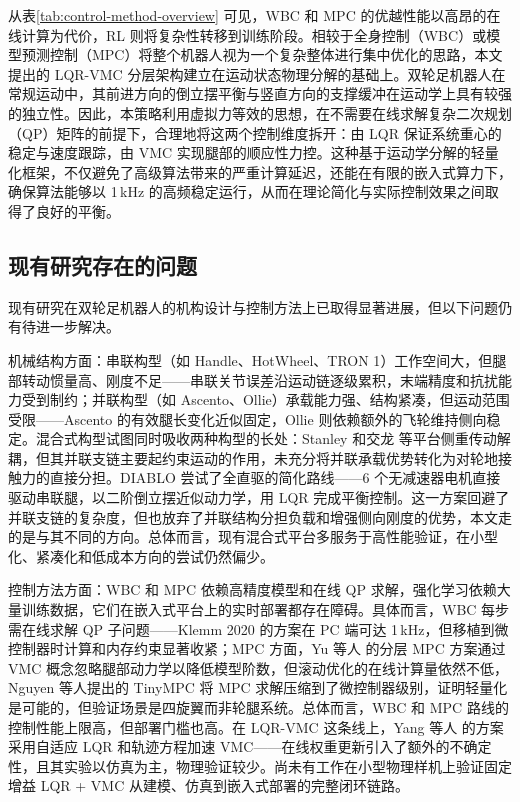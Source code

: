 从表\ref{tab:control-method-overview} 可见，WBC 和 MPC 的优越性能以高昂的在线计算为代价，RL 则将复杂性转移到训练阶段。相较于全身控制（WBC）或模型预测控制（MPC）将整个机器人视为一个复杂整体进行集中优化的思路，本文提出的 LQR-VMC 分层架构建立在运动状态物理分解的基础上。双轮足机器人在常规运动中，其前进方向的倒立摆平衡与竖直方向的支撑缓冲在运动学上具有较强的独立性。因此，本策略利用虚拟力等效的思想，在不需要在线求解复杂二次规划（QP）矩阵的前提下，合理地将这两个控制维度拆开：由 LQR 保证系统重心的稳定与速度跟踪，由 VMC 实现腿部的顺应性力控。这种基于运动学分解的轻量化框架，不仅避免了高级算法带来的严重计算延迟，还能在有限的嵌入式算力下，确保算法能够以 1\,kHz 的高频稳定运行，从而在理论简化与实际控制效果之间取得了良好的平衡。

\subsection{现有研究存在的问题}

现有研究在双轮足机器人的机构设计与控制方法上已取得显著进展，但以下问题仍有待进一步解决。

机械结构方面：串联构型（如 Handle\cite{boston2023handle}、HotWheel\cite{yu2023hotwheel}、TRON 1\cite{limx2025tron1}）工作空间大，但腿部转动惯量高、刚度不足——串联关节误差沿运动链逐级累积，末端精度和抗扰能力受到制约；并联构型（如 Ascento\cite{klemm2019ascento}、Ollie\cite{wang2021ollie}）承载能力强、结构紧凑，但运动范围受限——Ascento 的有效腿长变化近似固定，Ollie 则依赖额外的飞轮维持侧向稳定。混合式构型试图同时吸收两种构型的长处：Stanley\cite{stanley2025} 和交龙\cite{sjtu2025rm} 等平台侧重传动解耦，但其并联支链主要起约束运动的作用，未充分将并联承载优势转化为对轮地接触力的直接分担。DIABLO\cite{liu2024diablo} 尝试了全直驱的简化路线——6 个无减速器电机直接驱动串联腿，以二阶倒立摆近似动力学，用 LQR 完成平衡控制。这一方案回避了并联支链的复杂度，但也放弃了并联结构分担负载和增强侧向刚度的优势，本文走的是与其不同的方向。总体而言，现有混合式平台多服务于高性能验证，在小型化、紧凑化和低成本方向的尝试仍然偏少。

控制方法方面：WBC 和 MPC 依赖高精度模型和在线 QP 求解，强化学习依赖大量训练数据，它们在嵌入式平台上的实时部署都存在障碍。具体而言，WBC 每步需在线求解 QP 子问题——Klemm 2020\cite{klemm2020lqr} 的方案在 PC 端可达 1\,kHz，但移植到微控制器时计算和内存约束显著收紧；MPC 方面，Yu 等人\cite{yu2023mpc} 的分层 MPC 方案通过 VMC 概念忽略腿部动力学以降低模型阶数，但滚动优化的在线计算量依然不低，Nguyen 等人提出的 TinyMPC\cite{nguyen2024tinympc} 将 MPC 求解压缩到了微控制器级别，证明轻量化是可能的，但验证场景是四旋翼而非轮腿系统。总体而言，WBC 和 MPC 路线的控制性能上限高，但部署门槛也高。在 LQR-VMC 这条线上，Yang 等人\cite{yang2024integrated} 的方案采用自适应 LQR 和轨迹方程加速 VMC——在线权重更新引入了额外的不确定性，且其实验以仿真为主，物理验证较少。尚未有工作在小型物理样机上验证固定增益 LQR + VMC 从建模、仿真到嵌入式部署的完整闭环链路。
